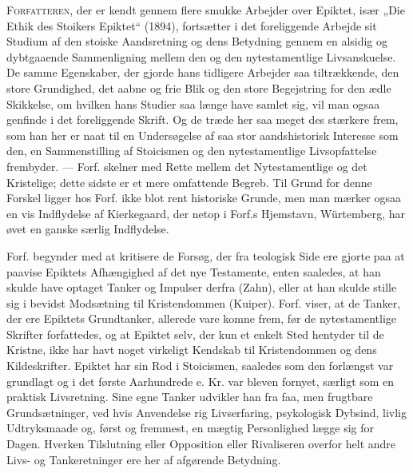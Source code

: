 \documentclass[12pt,a4paper,openany]{book}
\newcommand{\opage}[1]{\marginnote{\footnotesize\textit{[#1]}}}
\begin{document}
F\textsc{orfatteren}, der er kendt gennem flere smukke Arbejder
over Epiktet, især „Die Ethik des Stoikers Epiktet“ (1894),
fortsætter i det foreliggende Arbejde sit Studium af den stoiske
Aandsretning og dens Betydning gennem en alsidig og dybtgaaende
Sammenligning mellem den og den nytestamentlige
Livsanskuelse. De samme Egenskaber, der gjorde hans tidligere
Arbejder saa tiltrækkende, den store Grundighed, det aabne og
frie Blik og den store Begejstring for den ædle Skikkelse, om
hvilken hans Studier saa længe have samlet sig, vil man ogsaa
genfinde i det foreliggende Skrift. Og de træde her saa meget
des stærkere frem, som han her er naat til en Undersøgelse af
saa stor aandshistorisk Interesse som den, en Sammenstilling af
Stoicismen og den nytestamentlige Livsopfattelse frembyder.
--- Forf. skelner med Rette mellem det Nytestamentlige og det
Kristelige; dette sidste er et mere omfattende Begreb. Til
Grund for denne Forskel ligger hos Forf. ikke blot rent historiske
Grunde, men man mærker ogsaa en vis Indflydelse af
Kierkegaard, der netop i Forf.s Hjemstavn, Würtemberg, har
øvet en ganske særlig Indflydelse.

Forf. begynder med at kritisere de Forsøg, der fra teologisk
Side ere gjorte paa at paavise Epiktets Afhængighed af det nye
Testamente, enten saaledes, at han skulde have optaget Tanker
og Impulser derfra (Zahn), eller at han skulde stille sig i bevidst
Modsætning til Kristendommen (Kuiper). Forf. viser, at
\setcounter{footnote}{0}%
\opage{103}de Tanker, der ere Epiktets Grundtanker, allerede vare komne
frem, før de nytestamentlige Skrifter forfattedes, og at Epiktet
selv, der kun et enkelt Sted hentyder til de Kristne, ikke har
havt noget virkeligt Kendskab til Kristendommen og dens Kildeskrifter.
Epiktet har sin Rod i Stoicismen, saaledes som den
forlængst var grundlagt og i det første Aarhundrede e. Kr. var
bleven fornyet, særligt som en praktisk Livsretning. Sine egne
Tanker udvikler han fra faa, men frugtbare Grundsætninger,
ved hvis Anvendelse rig Livserfaring, psykologisk Dybsind, livlig
Udtryksmaade og, først og fremmest, en mægtig Personlighed
lægge sig for Dagen. Hverken Tilslutning eller Opposition
eller Rivaliseren overfor helt andre Livs- og Tankeretninger ere
her af afgørende Betydning.
\end{document}

